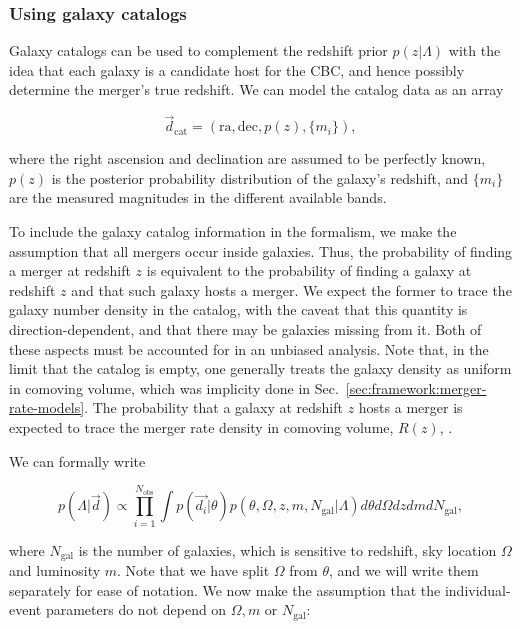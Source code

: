 \documentclass[%
preprint,
nofootinbib,
 amsmath,amssymb,
 aps,
]{revtex4-2}
\newcommand{\given}[2]{p( #1 | #2 )}
\newcommand{\nobs}[0]{N_{\text{obs}}}
\newcommand{\bv}[1]{{\color{red}{[BV: #1]}}}
\begin{document}
\bv{TODO}

\subsubsection{Using galaxy catalogs}

Galaxy catalogs can be used to complement the redshift prior $\given{z}{\Lambda}$ with the idea
that each galaxy is a candidate host for the CBC, and hence possibly determine the merger's true
redshift. We can model the catalog data as an array

\begin{equation}
	\vec{d}_\text{cat} = (\text{ra}, \text{dec}, p(z), \{m_i\}),
\end{equation}

where the right ascension and declination are assumed to be perfectly known, $p(z)$ is the
posterior probability distribution of the galaxy's redshift, and $\{m_i\}$ are the measured
magnitudes in the different available bands.

To include the galaxy catalog information in the formalism, we make the assumption that all mergers
occur inside galaxies. Thus, the probability of finding a merger at redshift $z$ is equivalent to
the probability of finding a galaxy at redshift $z$ and that such galaxy hosts a merger. We expect
the former to trace the galaxy number density in the catalog, with the caveat that this quantity is
direction-dependent, and that there may be galaxies missing from it. Both of these aspects must be
accounted for in an unbiased analysis. Note that, in the limit that the catalog is empty, one
generally treats the galaxy density as uniform in comoving volume, which was implicity done in
Sec.~\ref{sec:framework:merger-rate-models}. The probability that a galaxy at redshift $z$ hosts a
merger is expected to trace the merger rate density in comoving volume, $R(z)$, \bv{modulo a
	transformation to source-frame time}.

We can formally write

\begin{equation}
	\given{\Lambda}{\vec{d}} \propto \prod_{i=1}^{\nobs} \int \given{\vec{d_i}}{\theta} \given{\theta, \Omega, z, m, N_\text{gal}}{\Lambda} d\theta d\Omega  dz dm dN_\text{gal},
\end{equation}

where $N_\text{gal}$ is the number of galaxies, which is sensitive to redshift, sky location
$\Omega$ and luminosity $m$. Note that we have split $\Omega$ from $\theta$, and we will write them
separately for ease of notation. We now make the assumption that the individual-event parameters do
not depend on $\Omega, m$ or $N_\text{gal}$:
\end{document}
